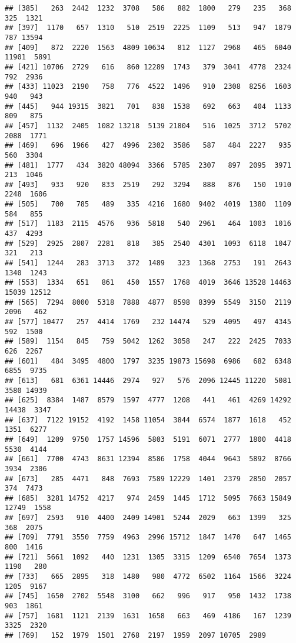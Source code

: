 \documentclass[
]{article}
\begin{document}
\begin{verbatim}
## [385]   263  2442  1232  3708   586   882  1800   279   235   368   325  1321
## [397]  1170   657  1310   510  2519  2225  1109   513   947  1879   787 13594
## [409]   872  2220  1563  4809 10634   812  1127  2968   465  6040 11901  5891
## [421] 10706  2729   616   860 12289  1743   379  3041  4778  2324   792  2936
## [433] 11023  2190   758   776  4522  1496   910  2308  8256  1603   940   943
## [445]   944 19315  3821   701   838  1538   692   663   404  1133   809   875
## [457]  1132  2405  1082 13218  5139 21804   516  1025  3712  5702  2088  1771
## [469]   696  1966   427  4996  2302  3586   587   484  2227   935   560  3304
## [481]  1777   434  3820 48094  3366  5785  2307   897  2095  3971   213  1046
## [493]   933   920   833  2519   292  3294   888   876   150  1910  2248  1606
## [505]   700   785   489   335  4216  1680  9402  4019  1380  1109   584   855
## [517]  1183  2115  4576   936  5818   540  2961   464  1003  1016   437  4293
## [529]  2925  2807  2281   818   385  2540  4301  1093  6118  1047   321   213
## [541]  1244   283  3713   372  1489   323  1368  2753   191  2643  1340  1243
## [553]  1334   651   861   450  1557  1768  4019  3646 13528 14463 15039 12512
## [565]  7294  8000  5318  7888  4877  8598  8399  5549  3150  2119  2096   462
## [577] 10477   257  4414  1769   232 14474   529  4095   497  4345   592  1500
## [589]  1154   845   759  5042  1262  3058   247   222  2425  7033   626  2267
## [601]   484  3495  4800  1797  3235 19873 15698  6986   682  6348  6855  9735
## [613]   681  6361 14446  2974   927   576  2096 12445 11220  5081  3580 14939
## [625]  8384  1487  8579  1597  4777  1208   441   461  4269 14292 14438  3347
## [637]  7122 19152  4192  1458 11054  3844  6574  1877  1618   452  1351  6277
## [649]  1209  9750  1757 14596  5803  5191  6071  2777  1800  4418  5530  4144
## [661]  7700  4743  8631 12394  8586  1758  4044  9643  5892  8766  3934  2306
## [673]   285  4471   848  7693  7589 12229  1401  2379  2850  2057   374  7473
## [685]  3281 14752  4217   974  2459  1445  1712  5095  7663 15849 12749  1558
## [697]  2593   910  4400  2409 14901  5244  2029   663  1399   325   368  2075
## [709]  7791  3550  7759  4963  2996 15712  1847  1470   647  1465   800  1416
## [721]  5661  1092   440  1231  1305  3315  1209  6540  7654  1373  1190   280
## [733]   665  2895   318  1480   980  4772  6502  1164  1566  3224  1205  9167
## [745]  1650  2702  5548  3100   662   996   917   950  1432  1738   903  1861
## [757]  1681  1121  2139  1631  1658   663   469  4186   167  1239  3325  2320
## [769]   152  1979  1501  2768  2197  1959  2097 10705  2989
\end{verbatim}
\end{document}
